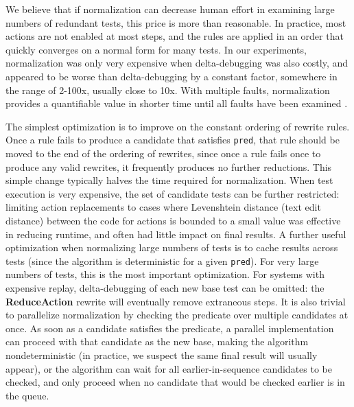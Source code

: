 We believe that if normalization can decrease human effort in
examining large numbers of redundant tests, this price is more
than reasonable.  In practice, most actions are not enabled at most
steps, and the rules are applied in an order that quickly converges on
a normal form for many tests.  In our experiments, normalization
was only very expensive when delta-debugging was also costly, and
appeared to be worse than delta-debugging by a constant factor,
somewhere in the range of 2-100x, usually close to 10x.  With multiple
faults, normalization provides a quantifiable value in
shorter time until all faults have been examined \cite{PLDI13}.


The simplest optimization is to improve on the constant ordering of
rewrite rules.  Once a rule fails to produce a candidate that
satisfies {\tt pred}, that rule should be moved to the end of the
ordering of rewrites, since once a rule fails once to produce any
valid rewrites, it frequently produces no further reductions.  This
simple change typically halves the time required for normalization.
When test execution is very expensive, the set of candidate tests can be further restricted: limiting action replacements to cases
where Levenshtein \cite{Lev} distance (text edit distance) between the
code for actions is bounded to a small value was effective in
reducing runtime, and often had little impact on final results.
A further useful optimization when normalizing large numbers of tests
is to cache results across tests (since the algorithm is deterministic
for a given {\tt pred}).   For very large
numbers of tests, this is the most important optimization.
For systems with
expensive replay, delta-debugging of each new base test
can be omitted: the {\bf ReduceAction} rewrite will
eventually remove extraneous steps.  
It is also trivial to parallelize normalization by
checking the predicate over multiple candidates at once.  As soon as a
candidate satisfies the predicate, a parallel implementation can proceed with that candidate as the new
base, making the algorithm nondeterministic (in practice, we suspect
the same final result will usually appear), or the algorithm can wait
for all earlier-in-sequence candidates to be checked, and only proceed
when no candidate that would be checked earlier is in the queue.

